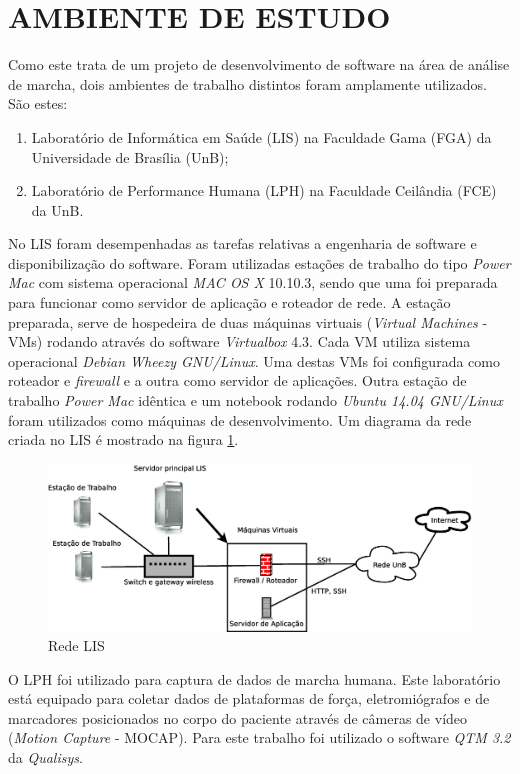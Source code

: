 \section[AMBIENTE DE ESTUDO]{AMBIENTE DE ESTUDO}

Como este trata de um projeto de desenvolvimento de software na área de análise de marcha, dois ambientes de trabalho distintos foram amplamente utilizados. São estes:

\begin{enumerate}
	\item Laboratório de Informática em Saúde (LIS) na Faculdade Gama (FGA) da Universidade de Brasília (UnB);
	\item Laboratório de Performance Humana (LPH) na Faculdade Ceilândia (FCE) da UnB.
\end{enumerate}

No LIS foram desempenhadas as tarefas relativas a engenharia de software e disponibilização do software.
Foram utilizadas estações de trabalho do tipo \emph{Power Mac} com sistema operacional \emph{MAC OS X} 10.10.3, sendo que uma foi preparada para funcionar como servidor de aplicação e roteador de rede. 
A estação preparada, serve de hospedeira de duas máquinas virtuais (\emph{Virtual Machines} - VMs) rodando através do software \emph{Virtualbox} 4.3. 
Cada VM utiliza sistema operacional \emph{Debian Wheezy GNU/Linux}. 
Uma destas VMs foi configurada como roteador e \emph{firewall} e a outra como servidor de aplicações.  
Outra estação de trabalho \emph{Power Mac} idêntica e um notebook rodando \emph{Ubuntu 14.04 GNU/Linux} foram utilizados como máquinas de desenvolvimento.
Um diagrama da rede criada no LIS é mostrado na figura \ref{lis_rede}.

\begin{figure}[ht]
	\centering
	\includegraphics[width=15cm]{figuras/lis_rede.eps}
	\caption{Rede LIS}
	\label{lis_rede}
\end{figure}

O LPH foi utilizado para captura de dados de marcha humana. Este laboratório está equipado para coletar dados de plataformas de força, eletromiógrafos e de marcadores posicionados no corpo do paciente através de câmeras de vídeo (\emph{Motion Capture} - MOCAP). Para este trabalho foi utilizado o software \emph{QTM 3.2} da \emph{Qualisys}. 
